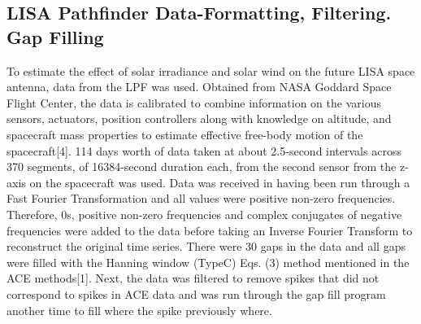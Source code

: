 \documentclass[%
 reprint,
 amsmath,amssymb,
 aps,
]{revtex4-2}
\begin{document}
\subsection{LISA Pathfinder Data-Formatting, Filtering. Gap Filling}
To estimate the effect of solar irradiance and solar wind on the future LISA space antenna, data from the LPF was used. Obtained from NASA Goddard Space Flight Center, the data is calibrated to combine information on the various sensors, actuators, position controllers along with knowledge on altitude, and spacecraft mass properties to estimate effective free-body motion of the spacecraft[4]. 114 days worth of data taken at about 2.5-second intervals across 370 segments, of 16384-second duration each, from the second sensor from the z-axis on the spacecraft was used. Data was received in having been run through a Fast Fourier Transformation and all values were positive non-zero frequencies. Therefore, 0s, positive non-zero frequencies and complex conjugates of negative frequencies were added to the data before taking an Inverse Fourier Transform to reconstruct the original time series. There were 30 gaps in the data and all gaps were filled with the Hanning window (TypeC) Eqs. (3) method mentioned in the ACE methods[1]. Next, the data was filtered to remove spikes that did not correspond to spikes in ACE data and was run through the gap fill program another time to fill where the spike previously where.
\end{document}
